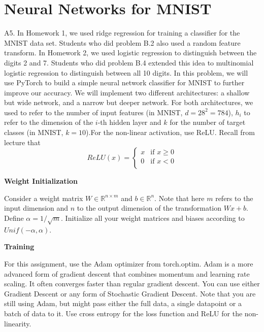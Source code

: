 \documentclass{article}
\newcommand{\field}[1]{\mathbb{#1}}
\newcommand{\1}{\mathbf{1}}
\newcommand{\R}{\field{R}} %
\begin{document}
\newpage
\section*{Neural Networks for MNIST}
A5. In Homework 1, we used ridge regression for training a classifier for the MNIST data set. Students who did problem B.2 also used a random feature transform. In Homework 2, we used logistic regression to distinguish between the digits 2 and 7. Students who did problem B.4 extended this idea to multinomial logistic regression to distinguish between all 10 digits. In this problem, we will use PyTorch to build a simple neural network classifier for MNIST to further improve our accuracy. We will implement two different architectures: a shallow but wide network, and a narrow but deeper network. For both architectures, we used to refer to the number of input features (in MNIST, $d=28^2=784$), $h_i$ to refer to the dimension of the $i$-th hidden layer and $k$ for the number of target classes (in MNIST, $k=10$).For the non-linear activation, use ReLU. Recall from lecture that
$$ReLU(x) = \begin{cases} 
    x &\mbox{if } x \geq 0\\
    0 &\mbox{if } x < 0 \\
\end{cases} $$


\textbf{Weight Initialization}

Consider a weight matrix $W\in\R^{n\times m}$ and $b\in\R^n$. Note that here $m$ refers to the input dimension and $n$ to the output dimension of the transformation $Wx+b$. Define $\alpha = 1/\sqrt m$. Initialize all your weight matrices and biases according to $Unif(-\alpha,\alpha)$.

\textbf{Training} 

For this assignment, use the Adam optimizer from torch.optim. Adam is a more advanced form of gradient descent that combines momentum and learning rate scaling. It often  converges faster than regular gradient descent. You can use either Gradient Descent or any form of Stochastic Gradient Descent. Note that you are still using Adam,  but might pass either the full data, a single datapoint or a batch of data to it. Use cross entropy for the loss function and ReLU for the non-linearity.
\end{document}
